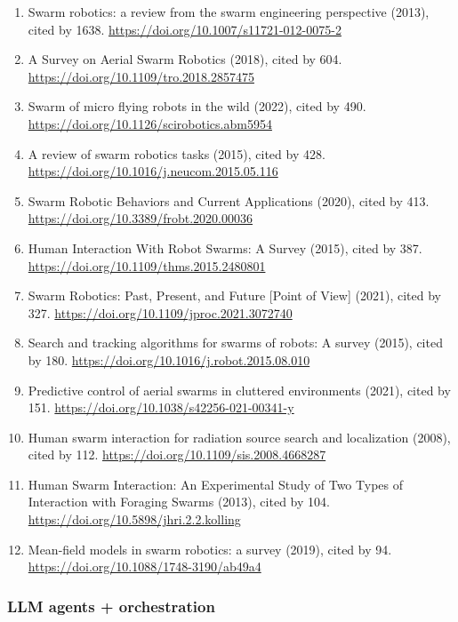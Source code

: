 \documentclass[
]{article}
\providecommand{\tightlist}{%
  \setlength{\itemsep}{0pt}\setlength{\parskip}{0pt}}
\begin{document}
\begin{enumerate}
\def\labelenumi{\arabic{enumi}.}
\tightlist
\item
  Swarm robotics: a review from the swarm engineering perspective
  (2013), cited by 1638. \url{https://doi.org/10.1007/s11721-012-0075-2}
\item
  A Survey on Aerial Swarm Robotics (2018), cited by 604.
  \url{https://doi.org/10.1109/tro.2018.2857475}
\item
  Swarm of micro flying robots in the wild (2022), cited by 490.
  \url{https://doi.org/10.1126/scirobotics.abm5954}
\item
  A review of swarm robotics tasks (2015), cited by 428.
  \url{https://doi.org/10.1016/j.neucom.2015.05.116}
\item
  Swarm Robotic Behaviors and Current Applications (2020), cited by 413.
  \url{https://doi.org/10.3389/frobt.2020.00036}
\item
  Human Interaction With Robot Swarms: A Survey (2015), cited by 387.
  \url{https://doi.org/10.1109/thms.2015.2480801}
\item
  Swarm Robotics: Past, Present, and Future {[}Point of View{]} (2021),
  cited by 327. \url{https://doi.org/10.1109/jproc.2021.3072740}
\item
  Search and tracking algorithms for swarms of robots: A survey (2015),
  cited by 180. \url{https://doi.org/10.1016/j.robot.2015.08.010}
\item
  Predictive control of aerial swarms in cluttered environments (2021),
  cited by 151. \url{https://doi.org/10.1038/s42256-021-00341-y}
\item
  Human swarm interaction for radiation source search and localization
  (2008), cited by 112. \url{https://doi.org/10.1109/sis.2008.4668287}
\item
  Human Swarm Interaction: An Experimental Study of Two Types of
  Interaction with Foraging Swarms (2013), cited by 104.
  \url{https://doi.org/10.5898/jhri.2.2.kolling}
\item
  Mean-field models in swarm robotics: a survey (2019), cited by 94.
  \url{https://doi.org/10.1088/1748-3190/ab49a4}
\end{enumerate}

\hypertarget{llm-agents-orchestration}{%
\subsubsection{LLM agents +
orchestration}\label{llm-agents-orchestration}}
\end{document}
